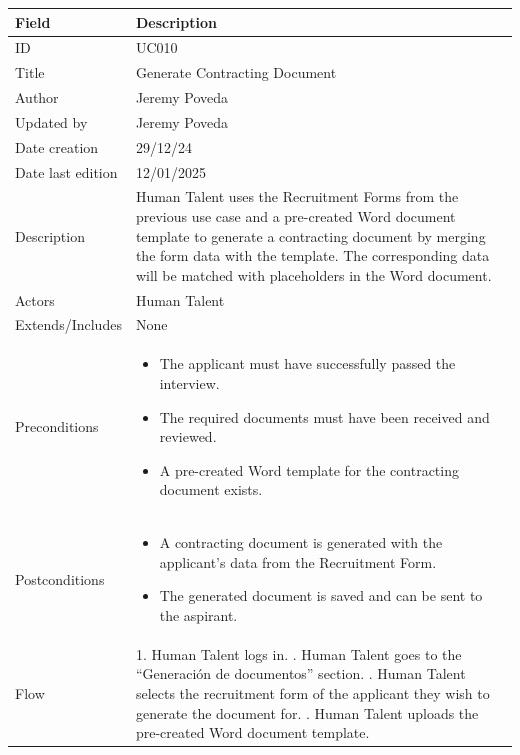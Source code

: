 \documentclass{scrreprt}
\begin{document}
\begin{table}[H]
	\centering
	\begin{tabular}{|p{3cm}|p{10cm}|}
		\hline
		\textbf{Field} & \textbf{Description} \\ \hline
		ID & UC010 \\ \hline
		Title & Generate Contracting Document \\ \hline
		Author & Jeremy Poveda \\ \hline
		Updated by & Jeremy Poveda \\ \hline
		Date creation & 29/12/24 \\ \hline
		Date last edition & 12/01/2025 \\ \hline
		Description & 
		Human Talent uses the Recruitment Forms from the previous use case and a pre-created Word document template to generate a contracting document by merging the form data with the template. The corresponding data will be matched with placeholders in the Word document. \\ \hline
		Actors & Human Talent \\ \hline
		Extends/Includes & None\\ \hline
		Preconditions & 
		\begin{itemize}
			\item The applicant must have successfully passed the interview.
			\item The required documents must have been received and reviewed.
			\item A pre-created Word template for the contracting document exists.
		\end{itemize} \\ \hline
		Postconditions & 
		\begin{itemize}
			\item A contracting document is generated with the applicant’s data from the Recruitment Form.
			\item The generated document is saved and can be sent to the aspirant.
		\end{itemize} \\ \hline
		Flow & 
		1. Human Talent logs in. \newline
		2. Human Talent goes to the “Generación de documentos” section. \newline
		3. Human Talent selects the recruitment form of the applicant they wish to generate the document for. \newline
		4. Human Talent uploads the pre-created Word document template. \newline

\end{tabular}
\end{table}
\end{document}
